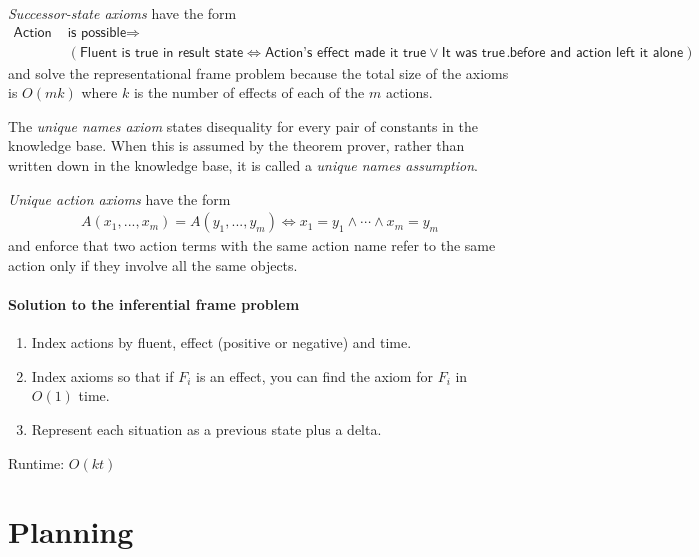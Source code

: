 \documentclass{article}
\begin{document}
\begin{theorem}[R\&N p. 267]
    \emph{Successor-state axioms} have the form
    \begin{align*}
        \textsf{Action } & \textsf{is possible} \Rightarrow                         \\
                         & (\textsf{Fluent is true in result state} \Leftrightarrow
        \textsf{Action's effect made it true}\vee \textsf{It was true before
            and action left it alone}).
    \end{align*}
    and solve the representational
    frame problem because the total size of the axioms is $O(mk)$ where
    $k$ is the number of effects of each of the $m$ actions.
\end{theorem}

\begin{definition}
    The \emph{unique names axiom} states disequality for every pair of
    constants in the knowledge base. When this is assumed by the theorem
    prover, rather than written down in the knowledge base, it is called
    a \emph{unique names assumption}.
\end{definition}

\begin{definition}
    \emph{Unique action axioms} have the form
    \begin{align*}
        A(x_1,...,x_m)=A(y_1,...,y_m)\Leftrightarrow x_1 = y_1\wedge\cdots \wedge x_m=y_m
    \end{align*}
    and enforce that two action terms with the same action name refer to the
    same action only if they involve all the same objects.
\end{definition}

\paragraph{Solution to the inferential frame problem}

\begin{enumerate}
    \item Index actions by fluent, effect (positive or negative) and time.
    \item Index axioms so that if $F_i$ is an effect, you can find the axiom for $F_i$ in $O(1)$ time.
    \item Represent each situation as a previous state plus a delta.
\end{enumerate}
Runtime: $O(kt)$

\section{Planning}
\end{document}
